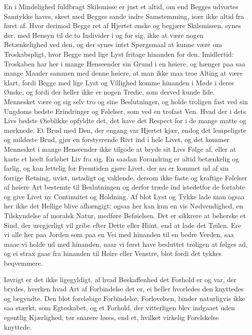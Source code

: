 \documentclass[12pt,a4paper]{book}
\newcommand{\apage}[1]{\marginnote{\footnotesize\textit{[#1]}}}
\begin{document}
En i Mindelighed fuldbragt Skilsmisse er just et altid, om end Begges
udvortes Samtykke haves, skeet med Begges sande indre Samstemming, især
ikke altid fra først af. Hvor derimod Begge ret af Hjertet ønske og
begjære Skilsmissen, synes der, med Hensyn til de to Individer i og for
sig, ikke at være nogen Betænkelighed ved den, og der synes intet
Spørgsmaal at kunne være om Troskabspligt, hvor Begge med lige Lyst
fritage hinanden for den. Imidlertid: Troskaben har her i mange
Henseender sin Grund i en høiere, og hænger paa saa mange Maader sammen
med denne høiere, at man ikke maa troe Alting at være klart, fordi Begge
med lige Lyst og Villighed komme hinanden i Møde i deres Ønske, og fordi
der heller ikke er nogen Tredie, som derved kunde lide. Mennesket være og
sig selv tro og sine Beslutninger, og holde troligen fast ved sin
Ungdoms bedste Erindringer og Følelser, som ved en trofast Ven. Hvad der
i dets Livs bedste Øieblikke opfyldte det, det have det Respect for i de
mange matte og mørknede. Et Brud med Den, der engang var Hjertet \apage{145} kjær,
endog det lempeligste og mildeste Brud, gjør en forstyrrende Rivt ind i
hele Livet, og det kommer Mennesket i mange Henseender ikke tilgode at
bryde sit Livs Følge af, eller at kaste et heelt forløbet Liv fra sig. En
saadan Forandring er altid betænkelig og farlig, og kan lettelig for
Fremtiden gjøre Livet, der nu er kommet ud af sin forrige Retning, uvist,
ustadigt og vaklende, dersom ikke faste og kraftige Følelser af høiere
Art bestemte til Beslutningen og derfor træde ind istedetfor de fortabte
og give Livet ny Continuitet og Holdning. Af blot Lyst og Tykke lade man
ogsaa her ikke det Hellige blive afhængigt; ogsaa her kan kun en vis
Nødvendighed, en Tilskyndelse af moralsk Natur, medføre Beføielsen. Det
er sikkrere at beherske et Sind, der uregjerligt vil gribe efter Dette
eller Hiint, end at lade det Tøilen. Ere vi alle her paa Jorden som paa
en Vei med hinanden til en bedre Verden, saa maae vi holde ud med
hinanden, naar vi først have besluttet troligen at følges ad, og ei strax
gaae fra hinanden til Høire eller Venstre, blot fordi det tykkes
beqvemmere.

Iøvrigt er det ikke ligegyldigt, af hvad Beskaffenhed det Forhold er og
var, der brydes, hverken hvad Art af Forbindelse det er, ei heller
hvorledes den knyttedes og begyndte. Den blot foreløbige Forbindelse,
Forlovelsen, binder naturligvis ikke saa stærkt, som Egteskabet, og et
Forhold, der vitterligen blev indgaaet \apage{146} uden egentlig Kjærlighed, tør
snarere løses, end et, hvilket virkelig Forelskelse knyttede.
\end{document}
